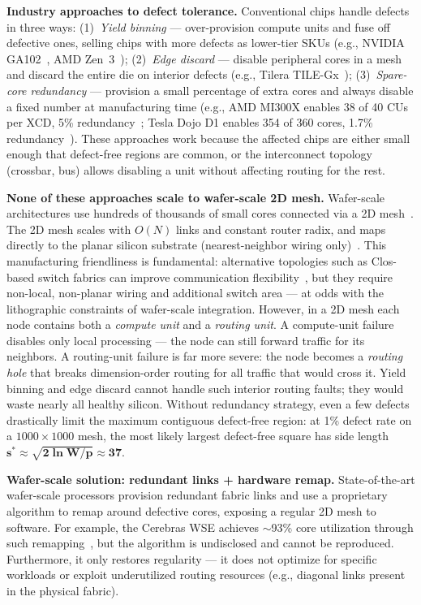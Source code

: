 \documentclass[sigplan,anonymous,review,nonacm]{acmart}
\begin{document}
\textbf{Industry approaches to defect tolerance.}
Conventional chips handle defects in three ways:
(1)~\emph{Yield binning} --- over-provision compute units and fuse off defective ones, selling chips with more defects as lower-tier SKUs (e.g., NVIDIA GA102~\cite{nvidia2020ga102}, AMD Zen~3~\cite{gamersnexus2013binning});
(2)~\emph{Edge discard} --- disable peripheral cores in a mesh and discard the entire die on interior defects (e.g., Tilera TILE-Gx~\cite{tilera2013tilegx});
(3)~\emph{Spare-core redundancy} --- provision a small percentage of extra cores and always disable a fixed number at manufacturing time (e.g., AMD MI300X enables 38 of 40 CUs per XCD, 5\% redundancy~\cite{amd2024mi300x}; Tesla Dojo D1 enables 354 of 360 cores, 1.7\% redundancy~\cite{talpes2023dojo}).
These approaches work because the affected chips are either small enough that defect-free regions are common, or the interconnect topology (crossbar, bus) allows disabling a unit without affecting routing for the rest.

\textbf{None of these approaches scale to wafer-scale 2D mesh.}
Wafer-scale architectures use hundreds of thousands of small cores connected via a 2D mesh~\cite{lie2023cerebras}. The 2D mesh scales with $O(N)$ links and constant router radix, and maps directly to the planar silicon substrate (nearest-neighbor wiring only)~\cite{lie2019wafer}. This manufacturing friendliness is fundamental: alternative topologies such as Clos-based switch fabrics can improve communication flexibility~\cite{rashidi2025fred}, but they require non-local, non-planar wiring and additional switch area --- at odds with the lithographic constraints of wafer-scale integration.
However, in a 2D mesh each node contains both a \emph{compute unit} and a \emph{routing unit}. A compute-unit failure disables only local processing --- the node can still forward traffic for its neighbors. A routing-unit failure is far more severe: the node becomes a \emph{routing hole} that breaks dimension-order routing for all traffic that would cross it. Yield binning and edge discard cannot handle such interior routing faults; they would waste nearly all healthy silicon. Without redundancy strategy, even a few defects drastically limit the maximum contiguous defect-free region: at 1\% defect rate on a $1000 \times 1000$ mesh, the most likely largest defect-free square has side length $\boldsymbol{s^* \approx \sqrt{2\ln W / p} \approx 37}$.

\textbf{Wafer-scale solution: redundant links + hardware remap.}
State-of-the-art wafer-scale processors provision redundant fabric links and use a proprietary algorithm to remap around defective cores, exposing a regular 2D mesh to software. For example, the Cerebras WSE achieves ${\sim}$93\% core utilization through such remapping~\cite{cerebras2025sigops, luczynski2024reduce}, but the algorithm is undisclosed and cannot be reproduced. Furthermore, it only restores regularity --- it does not optimize for specific workloads or exploit underutilized routing resources (e.g., diagonal links present in the physical fabric).
\end{document}
